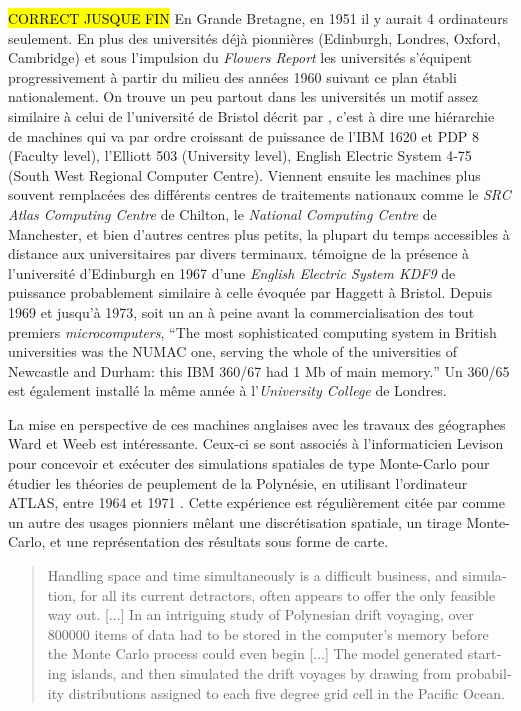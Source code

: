 \hl{CORRECT JUSQUE FIN}
En Grande Bretagne, en 1951 il y aurait 4 ordinateurs seulement. En plus des universités déjà pionnières (Edinburgh, Londres, Oxford, Cambridge) et sous l'impulsion du \textit{Flowers Report} les universités s'équipent progressivement à partir du milieu des années 1960 suivant ce plan établi nationalement. On trouve un peu partout dans les universités  un motif assez similaire à celui de l'université de Bristol décrit par \textcite{Haggett1969}, c'est à dire une hiérarchie de machines qui va par ordre croissant de puissance de l'IBM 1620 et PDP 8 (Faculty level), l'Elliott 503 (University level), English Electric System 4-75 (South West Regional Computer Centre). Viennent ensuite les machines plus souvent remplacées des différents centres de traitements nationaux comme le \textit{SRC Atlas Computing Centre} de Chilton, le \textit{National Computing Centre} de Manchester, et bien d'autres centres plus petits, la plupart du temps accessibles à distance aux universitaires par divers terminaux. \textcite{Rhind1989} témoigne de la présence à l'université d'Edinburgh en 1967 d'une \textit{English Electric System KDF9} de puissance probablement similaire à celle évoquée par Haggett à Bristol. Depuis 1969 et jusqu'à 1973, soit un an à peine avant la commercialisation des tout premiers \textit{microcomputers}, \foreignquote{english}{The most sophisticated computing system in British universities was the NUMAC one, serving the whole of the universities of Newcastle and Durham: this IBM 360/67 had 1 Mb of main memory.}  Un 360/65 est également installé la même année à l'\textit{University College} de Londres.

La mise en perspective de ces machines anglaises avec les travaux des géographes Ward et Weeb est intéressante. Ceux-ci se sont associés à l'informaticien Levison pour concevoir et exécuter des simulations spatiales de type Monte-Carlo pour étudier les théories de peuplement de la Polynésie, en utilisant l'ordinateur ATLAS, entre 1964 et 1971 \autocites{Montillier1974, Ward1973}. Cette expérience est régulièrement citée par \textcites{Gould1970, Gould1975} comme un autre des usages pionniers mêlant une discrétisation spatiale, un tirage Monte-Carlo, et une représentation des résultats sous forme de carte.

\foreignblockquote{english}[\cite{Gould1970}]{Handling space and time simultaneously is a difficult business, and simulation, for all its current detractors, often appears to offer the only feasible way out. [...] In an intriguing study of Polynesian drift voyaging, over 800000 items of data had to be stored in the computer’s memory before the Monte Carlo process could even begin [...] The model generated starting islands, and then simulated the drift voyages by drawing from probability distributions assigned to each five degree grid cell in the Pacific Ocean.}

